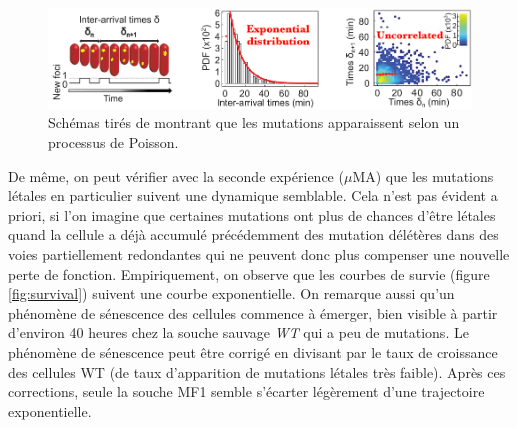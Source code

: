 \documentclass[12pt]{article}
\begin{document}
\begin{figure}[h]
  \begin{center}
    \vspace{3mm}
    \includegraphics[scale=0.45]{../Img/Interarrival_times.png}
  \end{center}  
  \caption{\label{fig:iatime}Schémas tirés de \cite{rob} montrant que les mutations apparaissent selon un processus de Poisson.}
\end{figure}
\FloatBarrier

De même, on peut vérifier avec la seconde expérience ($\mu$MA) que les mutations létales en particulier suivent une dynamique semblable. Cela n'est pas évident a priori, si l'on imagine que certaines mutations ont plus de chances d'être létales quand la cellule a déjà accumulé précédemment des mutation délétères dans des voies partiellement redondantes qui ne peuvent donc plus compenser une nouvelle perte de fonction. Empiriquement, on observe que les courbes de survie (figure \ref{fig:survival}) suivent une courbe exponentielle. On remarque aussi qu'un phénomène de sénescence des cellules commence à émerger, bien visible à partir d'environ 40 heures chez la souche sauvage \emph{WT} qui a peu de mutations. Le phénomène de sénescence peut être corrigé en divisant par le taux de croissance des cellules WT (de taux d'apparition de mutations létales très faible). Après ces corrections, seule la souche MF1 semble s'écarter légèrement d'une trajectoire exponentielle.
\end{document}
